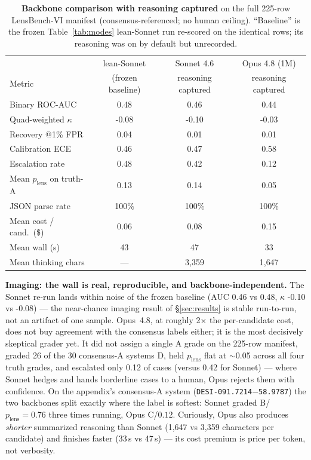 \documentclass[11pt,letterpaper]{article}
\newcommand{\plens}{\ensuremath{p_{\mathrm{lens}}}}
\newcommand{\rbAUC}{0.48}\newcommand{\rbQWK}{-0.08}\newcommand{\rbRecOne}{0.04}
\newcommand{\rbECE}{0.46}\newcommand{\rbEsc}{0.48}\newcommand{\rbPlensA}{0.13}
\newcommand{\rbParse}{100\%}\newcommand{\rbCost}{0.06}\newcommand{\rbWall}{43}
\newcommand{\rsAUC}{0.46}\newcommand{\rsQWK}{-0.10}\newcommand{\rsRecOne}{0.01}
\newcommand{\rsECE}{0.47}\newcommand{\rsEsc}{0.42}\newcommand{\rsPlensA}{0.14}
\newcommand{\rsParse}{100\%}\newcommand{\rsCost}{0.08}\newcommand{\rsWall}{47}
\newcommand{\rsThink}{3{,}359}
\newcommand{\roAUC}{0.44}\newcommand{\roQWK}{-0.03}\newcommand{\roRecOne}{0.01}
\newcommand{\roECE}{0.58}\newcommand{\roEsc}{0.12}\newcommand{\roPlensA}{0.05}
\newcommand{\roParse}{100\%}\newcommand{\roCost}{0.15}\newcommand{\roWall}{33}
\newcommand{\roThink}{1{,}647}\newcommand{\roCostRatio}{2}
\begin{document}
\begin{table}[ht]\centering
\caption{\textbf{Backbone comparison with reasoning captured} on the full 225-row
LensBench-VI manifest (consensus-referenced; no human ceiling). ``Baseline'' is the
frozen Table~\ref{tab:modes} lean-Sonnet run re-scored on the identical rows;
its reasoning was on by default but unrecorded.}
\label{tab:reasoning}
\small
\begin{tabular}{lccc}
\hline
 & lean-Sonnet & Sonnet 4.6 & Opus 4.8 (1M) \\
Metric & (frozen baseline) & reasoning captured & reasoning captured \\
\hline
Binary ROC-AUC            & \rbAUC    & \rsAUC    & \roAUC \\
Quad-weighted $\kappa$    & \rbQWK    & \rsQWK    & \roQWK \\
Recovery @1\% FPR         & \rbRecOne & \rsRecOne & \roRecOne \\
Calibration ECE           & \rbECE    & \rsECE    & \roECE \\
Escalation rate           & \rbEsc    & \rsEsc    & \roEsc \\
Mean \plens{} on truth-A  & \rbPlensA & \rsPlensA & \roPlensA \\
JSON parse rate           & \rbParse  & \rsParse  & \roParse \\
Mean cost / cand.\ (\$)   & \rbCost   & \rsCost   & \roCost \\
Mean wall (s)             & \rbWall   & \rsWall   & \roWall \\
Mean thinking chars       & ---       & \rsThink  & \roThink \\
\hline
\end{tabular}
\end{table}

\textbf{Imaging: the wall is real, reproducible, and backbone-independent.} The
Sonnet re-run lands within noise of the frozen baseline (AUC \rsAUC{} vs \rbAUC,
$\kappa$ \rsQWK{} vs \rbQWK) --- the near-chance imaging result of
\S\ref{sec:results} is stable run-to-run, not an artifact of one sample. Opus~4.8,
at roughly \roCostRatio$\times$ the per-candidate cost, does not buy agreement with
the consensus labels either; it is the most decisively skeptical grader yet. It did
not assign a single A grade on the 225-row manifest, graded 26 of the 30
consensus-A systems D, held \plens{} flat at $\sim$0.05 across all four truth
grades, and escalated only \roEsc{} of cases (versus \rsEsc{} for Sonnet) --- where
Sonnet hedges and hands borderline cases to a human, Opus rejects them with
confidence. On the appendix's consensus-A system
(\texttt{DESI-091.7214$-$58.9787}) the two backbones split exactly where the label
is softest: Sonnet graded B/$\plens{=}0.76$ three times running, Opus C/$0.12$.
Curiously, Opus also produces \emph{shorter} summarized reasoning than Sonnet
(\roThink{} vs \rsThink{} characters per candidate) and finishes faster
(\roWall{}\,s vs \rsWall{}\,s) --- its cost premium is price per token, not
verbosity.
\end{document}
